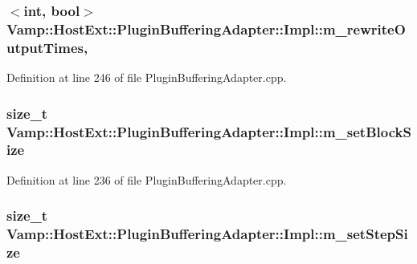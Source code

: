 \subsubsection[{\texorpdfstring{m\+\_\+rewrite\+Output\+Times}{m_rewriteOutputTimes}}]{$<${\bf int}, {\bf bool}$>$ Vamp\+::\+Host\+Ext\+::\+Plugin\+Buffering\+Adapter\+::\+Impl\+::m\+\_\+rewrite\+Output\+Times\hspace{0.3cm}{\ttfamily [mutable]}, {\ttfamily [protected]}}\hypertarget{class_vamp_1_1_host_ext_1_1_plugin_buffering_adapter_1_1_impl_ac3055f44b2a62c1a7aa915e180ed054b}{}\label{class_vamp_1_1_host_ext_1_1_plugin_buffering_adapter_1_1_impl_ac3055f44b2a62c1a7aa915e180ed054b}


Definition at line 246 of file Plugin\+Buffering\+Adapter.\+cpp.

\subsubsection[{\texorpdfstring{m\+\_\+set\+Block\+Size}{m_setBlockSize}}]{\setlength{\rightskip}{0pt plus 5cm}size\+\_\+t Vamp\+::\+Host\+Ext\+::\+Plugin\+Buffering\+Adapter\+::\+Impl\+::m\+\_\+set\+Block\+Size\hspace{0.3cm}{\ttfamily [protected]}}\hypertarget{class_vamp_1_1_host_ext_1_1_plugin_buffering_adapter_1_1_impl_a2a00da220493d24e0e980570d90432f0}{}\label{class_vamp_1_1_host_ext_1_1_plugin_buffering_adapter_1_1_impl_a2a00da220493d24e0e980570d90432f0}


Definition at line 236 of file Plugin\+Buffering\+Adapter.\+cpp.

\subsubsection[{\texorpdfstring{m\+\_\+set\+Step\+Size}{m_setStepSize}}]{\setlength{\rightskip}{0pt plus 5cm}size\+\_\+t Vamp\+::\+Host\+Ext\+::\+Plugin\+Buffering\+Adapter\+::\+Impl\+::m\+\_\+set\+Step\+Size\hspace{0.3cm}{\ttfamily [protected]}}\hypertarget{class_vamp_1_1_host_ext_1_1_plugin_buffering_adapter_1_1_impl_abc262019ad958eff91de177a6040540b}{}\label{class_vamp_1_1_host_ext_1_1_plugin_buffering_adapter_1_1_impl_abc262019ad958eff91de177a6040540b}


